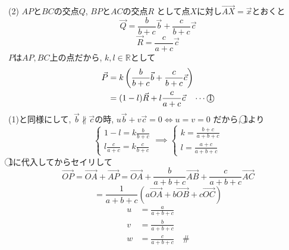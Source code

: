 \documentclass[../main.tex]{subfiles}
\begin{document}
(2) $AP$と$BC$の交点$Q$, $BP$と$AC$の交点$R$
として点$X$に対し$\overrightarrow{AX} = \vec{x}$とおくと
$$ \vec{Q} = \frac{b}{b+c} \vec{b} + \frac{c}{b+c} \vec{c} $$
$$ \vec{R} = \frac{c}{a+c} \vec{c} $$
$P$は$AP, BC$上の点だから, $k, l \in \mathbb{R}$として
\begin{align*}
  \vec{P} &= k \left( \frac{b}{b+c} \vec{b} + \frac{c}{b+c} \vec{c} \right) \\
  &= (1-l) \vec{R} + l \frac{c}{a+c} \vec{c} \quad \cdots \text{\textcircled{1}}
\end{align*}
(1)と同様にして, $\vec{b} \not\parallel \vec{c}$の時, $u \vec{b} + v \vec{c} = 0 \iff u = v = 0$
だから, \textcircled{1}より
$$
\begin{cases}
  1-l = k \frac{b}{b+c} \\
  l \frac{c}{a+c} = k \frac{c}{b+c}
\end{cases}
\implies
\begin{cases}
  k = \frac{b+c}{a+b+c} \\
  l = \frac{a+c}{a+b+c}
\end{cases}
$$
\textcircled{1}に代入してからセイリして
$$ \overrightarrow{OP} = \overrightarrow{OA} + \overrightarrow{AP} = \overrightarrow{OA} + \frac{b}{a+b+c} \overrightarrow{AB} + \frac{c}{a+b+c} \overrightarrow{AC} $$
$$ = \frac{1}{a+b+c} (a \overrightarrow{OA} + b \overrightarrow{OB} + c \overrightarrow{OC}) $$
\begin{align*}
  u &= \frac{a}{a+b+c} \\
  v &= \frac{b}{a+b+c} \\
  w &= \frac{c}{a+b+c} \quad \text{\#}
\end{align*}

\begin{center}
\end{center}
\end{document}
